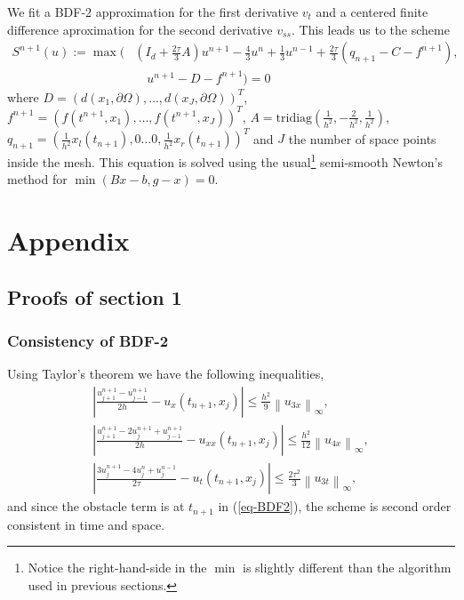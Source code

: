 \documentclass[12pt,a4paper]{article}
\newcommand{\ninf}[1]{\left\| {#1} \right\|_\infty}
\newcommand{\abs}[1]{\left\vert {#1} \right\vert}
\begin{document}
We fit a BDF-2 approximation for the first derivative $v_t$ and a centered finite difference aproximation for the second derivative $v_{ss}$. This leads us to the scheme
\begin{align*}
	S^{n+1}(u) := \max \bigg( &(I_d +\frac{2\tau}{3} A) u^{n+1} - \frac{4}{3} u^n + \frac{1}{3} u^{n-1} + \frac{2\tau}{3} (q_{n+1} - C - f^{n+1}), \\
	& \quad u^{n+1} - D - f^{n+1} \bigg) = 0
\end{align*} 
where $D = (d(x_1, \partial \Omega), \dots, d(x_J, \partial \Omega))^T$, $f^{n+1} = (f(t^{n+1},x_1), \dots, f(t^{n+1},x_J))^T$, $A = \text{tridiag} \left( \frac{1}{h^2},-\frac{2}{h^2},\frac{1}{h^2} \right)$, $q_{n+1} = \left( \frac{1}{h^2} x_l(t_{n+1}), 0 \dots 0, \frac{1}{h^2} x_r(t_{n+1}) \right)^T$ and $J$ the number of space points inside the mesh. This equation is solved using the usual\footnote{Notice the right-hand-side in the $\min$ is slightly different than the algorithm used in previous sections.} semi-smooth Newton's method for $\min(Bx - b, g - x) = 0$.


\newpage
\section{Appendix}

	\subsection{Proofs of section 1}
	
		\subsubsection{Consistency of BDF-2}

Using Taylor's theorem we have the following inequalities,
\begin{align*}
\abs{ \frac{u_{j+1}^{n+1}-u_{j-1}^{n+1}}{2h} - u_x(t_{n+1},x_j) } \leq \frac{h^2}{9} \ninf{u_{3x}}, \\
\abs{ \frac{u_{j+1}^{n+1}-2u_{j}^{n+1}+u_{j-1}^{n+1}}{2h} - u_{xx}(t_{n+1},x_j) } \leq \frac{h^2}{12} \ninf{u_{4x}}, \\
\abs{ \frac{3u_{j}^{n+1} - 4u_{j}^{n} + u_{j}^{n-1}}{2 \tau} - u_t(t_{n+1},x_j) } \leq \frac{2 \tau^2}{3} \ninf{u_{3t}},
\end{align*}
and since the obstacle term is at $t_{n+1}$ in (\ref{eq-BDF2}), the scheme is second order consistent in time and space.
\end{document}
